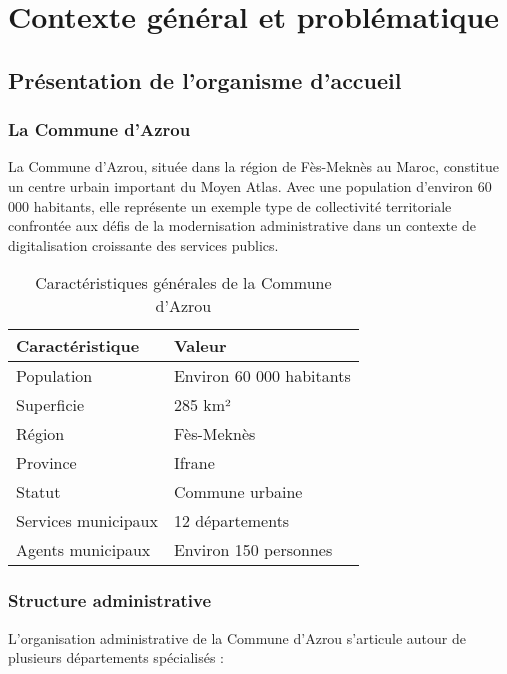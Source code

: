 \chapter{Contexte général et problématique}

\section{Présentation de l'organisme d'accueil}

\subsection{La Commune d'Azrou}

La Commune d'Azrou, située dans la région de Fès-Meknès au Maroc, constitue un centre urbain important du Moyen Atlas. Avec une population d'environ 60 000 habitants, elle représente un exemple type de collectivité territoriale confrontée aux défis de la modernisation administrative dans un contexte de digitalisation croissante des services publics.

\begin{table}[H]
\centering
\caption{Caractéristiques générales de la Commune d'Azrou}
\begin{tabular}{|l|l|}
\hline
\textbf{Caractéristique} & \textbf{Valeur} \\
\hline
Population & Environ 60 000 habitants \\
Superficie & 285 km² \\
Région & Fès-Meknès \\
Province & Ifrane \\
Statut & Commune urbaine \\
Services municipaux & 12 départements \\
Agents municipaux & Environ 150 personnes \\
\hline
\end{tabular}
\end{table}

\subsection{Structure administrative}

L'organisation administrative de la Commune d'Azrou s'articule autour de plusieurs départements spécialisés :


